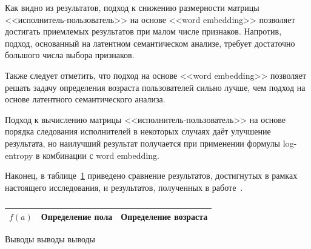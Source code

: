 Как видно из результатов, подход к снижению размерности
матрицы <<исполнитель-пользователь>> на основе <<word embedding>>
позволяет достигать приемлемых результатов при малом числе признаков.
Напротив, подход, основанный на латентном семантическом анализе,
требует достаточно большого числа выбора признаков.

Также следует отметить, что подход на основе <<word embedding>>
позволяет решать задачу определения возраста пользователей сильно
лучше, чем подход на основе латентного семантического анализа.

Подход к вычислению матрицы <<исполнитель-пользователь>> на
основе порядка следования исполнителей в некоторых случаях
даёт улучшение результата, но наилучший результат получается
при применении формулы log-entropy в комбинации с word embedding.

Наконец, в таблице~\ref{tab:total_results} приведено сравнение
результатов, достигнутых в рамках настоящего исследования, и
результатов, полученных в работе~\cite{wu2014gender}.

\begin{table}[!h]
    \caption{}
    \label{tab:total_results}
\centering
\begin{tabular}{|c|c|c|}\hline
    \boldmath$f(a)$ & \textbf{Определение пола} & \textbf{Определение возраста} \\\hline
\end{tabular}
\end{table}

\chapterconclusion

Выводы выводы выводы
